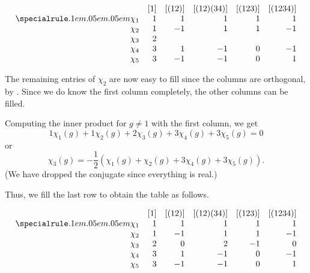 \begin{ex}
	\[\begin{array}{rrrrrr}
		 & [1] & [(12)] & [(12)(34)] & [(123)] & [(1234)]\\
		\thiccline
		\chi_1 & 1 &  1 &  1 &  1 &  1 \\
		\chi_2 & 1 & -1 &  1 &  1 & -1 \\
		\chi_3 & 2 &    &    &    &    \\
		\chi_4 & 3 &  1 & -1 &  0 & -1 \\
		\chi_5 & 3 & -1 & -1 &  0 &  1 \\
	\end{array}\]

	The remaining entries of $\chi_2$ are now easy to fill since the columns are orthogonal, by . Since we do know the first column completely, the other columns can be filled.

	Computing the inner product for $g \neq 1$ with the first column, we get
	\begin{equation*} 
		1 \chi_1(g) + 1 \chi_2(g) + 2 \chi_3(g) + 3 \chi_4(g) + 3 \chi_5(g) = 0
	\end{equation*}
	or
	\begin{equation*} 
		\chi_3(g) = -\frac{1}{2}(\chi_1(g) + \chi_2(g) + 3\chi_4(g) + 3\chi_5(g)).
	\end{equation*}
	(We have dropped the conjugate since everything is real.)

	Thus, we fill the last row to obtain the table as follows.

	\captionsetup{type=figure}
	\[\begin{array}{rrrrrr}
		 & [1] & [(12)] & [(12)(34)] & [(123)] & [(1234)]\\
		\thiccline
		\chi_1 & 1 &  1 &  1 &  1 &  1 \\
		\chi_2 & 1 & -1 &  1 &  1 & -1 \\
		\chi_3 & 2 &  0 &  2 & -1 &  0 \\
		\chi_4 & 3 &  1 & -1 &  0 & -1 \\
		\chi_5 & 3 & -1 & -1 &  0 &  1 \\
	\end{array}\]
	 \label{tab:charS4}
\end{ex}